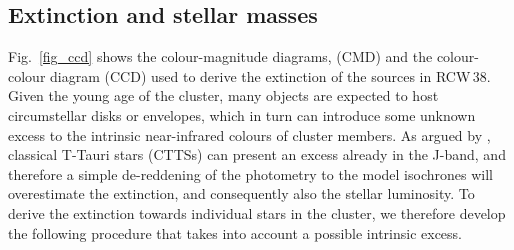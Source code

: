 \documentclass[a4paper,fleqn,usenatbib]{mnras}
\begin{document}
\subsection{Extinction and stellar masses}
\label{sec_mass}

Fig.~\ref{fig_ccd} shows the colour-magnitude diagrams, (CMD) and the colour-colour diagram (CCD) used to derive the extinction of the 
sources in RCW\,38. Given the young age of the cluster, many objects are expected to host circumstellar disks or envelopes, 
which in turn can introduce some unknown excess to the intrinsic near-infrared colours of cluster members. As argued by
\citet{cieza05}, classical T-Tauri stars (CTTSs) can present an excess already in the J-band, and therefore a simple de-reddening 
of the photometry to the model isochrones will overestimate the extinction, and consequently also the stellar luminosity. 
To derive the extinction towards individual stars in the cluster, we therefore develop the following procedure that takes into account a
possible intrinsic excess.
\end{document}
